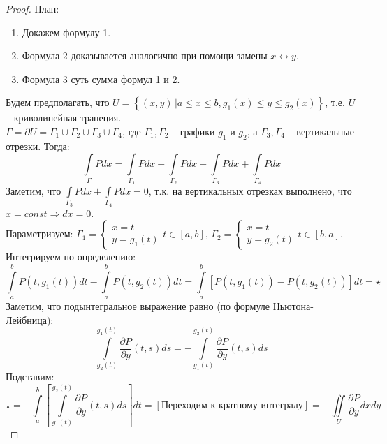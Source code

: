 \begin{proof}
    План:
    \begin{enumerate}
        \item Докажем формулу 1.
        \item Формула 2 доказывается аналогично при помощи замены $x \leftrightarrow y$.
        \item Формула 3 суть сумма формул 1 и 2.
    \end{enumerate}
    Будем предполагать, что $U = \left\{ (x, y) \, | a \leqslant x \leqslant b, g_1(x) \leqslant y \leqslant g_2(x) \right\}$,
    т.е. $U$ -- криволинейная трапеция.\\
    $\Gamma = \partial U = \Gamma_1 \cup \Gamma_2 \cup \Gamma_3 \cup \Gamma_4$, где $\Gamma_1, \Gamma_2$ -- графики $g_1$ и $g_2$,
    а $\Gamma_3, \Gamma_4$ -- вертикальные отрезки. Тогда:
    \[
        \int\limits_{\Gamma} Pdx =
        \int\limits_{\Gamma_1} Pdx + \int\limits_{\Gamma_2} Pdx + \int\limits_{\Gamma_3} Pdx + \int\limits_{\Gamma_4} Pdx
    \]
    Заметим, что $\int\limits_{\Gamma_3} Pdx + \int\limits_{\Gamma_4} Pdx = 0$,
    т.к. на вертикальных отрезках выполнено, что $x = const \Rightarrow dx = 0$.\\
    Параметризуем: $\Gamma_1 = \begin{cases} x = t\\ y = g_1(t)\end{cases} t \in [a, b]$, $\Gamma_2 = \begin{cases} x = t\\ y = g_2(t)\end{cases} t \in [b, a]$.
    Интегрируем по определению:
    \[
        \int\limits_{a}^{b} P(t, g_1(t))dt - \int\limits_{a}^{b} P(t, g_2(t))dt =
        \int\limits_{a}^{b} \left[P(t, g_1(t)) - P(t, g_2(t)) \right] dt = \star
    \]
    Заметим, что подынтегральное выражение равно (по формуле Ньютона-Лейбница):
    \[
        \int\limits_{g_2(t)}^{g_1(t)} \frac{\partial P}{\partial y}(t, s)ds =
        -\int\limits_{g_1(t)}^{g_2(t)} \frac{\partial P}{\partial y}(t, s)ds
    \]
    Подставим:
    \[
        \star = -\int\limits_a^b \left[\int\limits_{g_1(t)}^{g_2(t)} \frac{\partial P}{\partial y}(t, s)ds \right]dt = [\text{Переходим к кратному интегралу}] =
        -\iint\limits_{U} \frac{\partial P}{\partial y}dxdy
    \]
\end{proof}